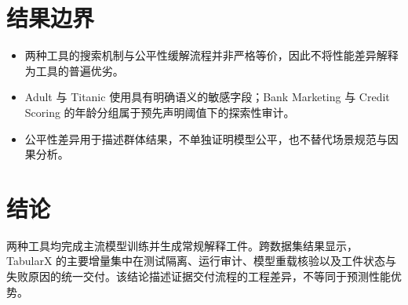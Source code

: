 \documentclass[degree=bachelor,language=chinese,fontset=fandol]{thuthesis}
\begin{document}
\chapter{结果边界}
\begin{itemize}
\item 两种工具的搜索机制与公平性缓解流程并非严格等价，因此不将性能差异解释为工具的普遍优劣。
\item Adult 与 Titanic 使用具有明确语义的敏感字段；Bank Marketing 与 Credit Scoring 的年龄分组属于预先声明阈值下的探索性审计。
\item 公平性差异用于描述群体结果，不单独证明模型公平，也不替代场景规范与因果分析。
\end{itemize}

\chapter{结论}
两种工具均完成主流模型训练并生成常规解释工件。跨数据集结果显示，TabularX 的主要增量集中在测试隔离、运行审计、模型重载核验以及工件状态与失败原因的统一交付。该结论描述证据交付流程的工程差异，不等同于预测性能优势。
\end{document}
